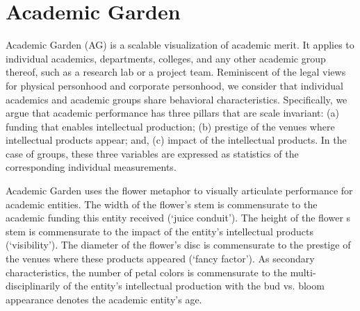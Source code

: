



\section {Academic Garden}
Academic Garden (AG) is a scalable visualization of academic merit. It applies to individual academics, departments, colleges, and any other academic group thereof, such as a research lab or a project team. Reminiscent of the legal views for physical personhood and corporate personhood, we consider that individual academics and academic groups share behavioral characteristics. Specifically, we argue that academic performance has three pillars that are scale invariant: (a) funding that enables intellectual production; (b) prestige of the venues where intellectual products appear; and, (c) impact of the intellectual products. In the case of groups, these three variables are expressed as statistics of the corresponding individual measurements. 

Academic Garden uses the flower metaphor to visually articulate performance for academic entities. The width of the flower's stem is commensurate to the academic funding this entity received (`juice conduit'). The height of the flower
s stem is commensurate to the impact of the entity's intellectual products (`visibility'). The diameter of the flower's disc is commensurate to the prestige of the venues where these products appeared (`fancy factor'). As secondary characteristics, the number of petal colors is commensurate to the multi-disciplinarily of the entity's intellectual production with the bud vs. bloom appearance denotes the academic entity's age.

